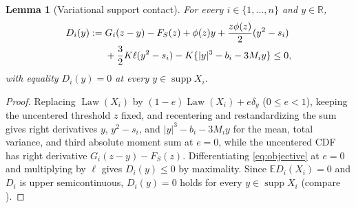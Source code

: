 \documentclass[11pt]{article}
\numberwithin{equation}{section}
\newtheorem{lemma}[theorem]{Lemma}
\theoremstyle{remark}
\DeclareMathOperator{\supp}{supp}
\DeclareMathOperator{\Law}{Law}
\newcommand{\E}{\mathbb E}
\newcommand{\R}{\mathbb R}
\begin{document}
\begin{lemma}[Variational support contact]\label{lem:contact}
For every $i\in\{1,\ldots,n\}$ and $y\in\R$,
\begin{align}
 D_i(y):={}&G_i(z-y)-F_S(z)+\phi(z)y
       +\frac{z\phi(z)}2(y^2-s_i)\notag\\
 &+\frac32K\ell(y^2-s_i)
       -K\{|y|^3-b_i-3M_i y\}\le0,                 \label{eq:contact}
\end{align}
with equality $D_i(y)=0$ at every $y\in\supp X_i$.
\end{lemma}
\begin{proof}
Replacing $\Law(X_i)$ by $(1-e)\Law(X_i)+e\delta_y$ ($0\le e<1$), keeping
the uncentered threshold $z$ fixed, and recentering and restandardizing the
sum gives right derivatives $y$, $y^2-s_i$, and $|y|^3-b_i-3M_i y$ for the
mean, total variance, and third absolute moment sum at $e=0$, while the
uncentered CDF has right derivative $G_i(z-y)-F_S(z)$. Differentiating
\eqref{eq:objective} at $e=0$ and multiplying by $\ell$ gives $D_i(y)\le0$
by maximality. Since $\E D_i(X_i)=0$ and $D_i$ is upper semicontinuous,
$D_i(y)=0$ holds for every $y\in\supp X_i$ (compare \citet[Lemma~4.3]{HeCheng2026}).
\end{proof}
\end{document}
